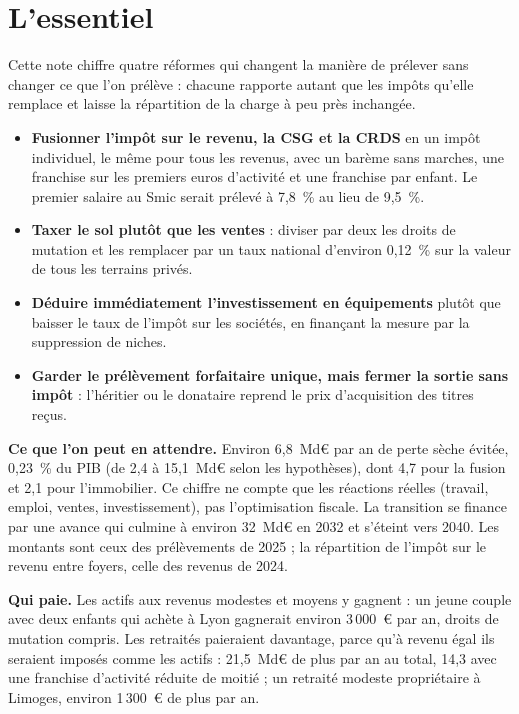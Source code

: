 \section*{L'essentiel}

Cette note chiffre quatre réformes qui changent la manière de prélever sans changer ce que l'on prélève : chacune
rapporte autant que les impôts qu'elle remplace et laisse la répartition de la charge à peu près inchangée.

\begin{itemize}\setlength{\itemsep}{1pt}
\item \textbf{Fusionner l'impôt sur le revenu, la CSG et la CRDS} en un impôt individuel, le même pour tous les revenus,
avec un barème sans marches, une franchise sur les premiers euros d'activité et une franchise par enfant. Le premier
salaire au Smic serait prélevé à 7,8~\% au lieu de 9,5~\%.
\item \textbf{Taxer le sol plutôt que les ventes} : diviser par deux les droits de mutation et les remplacer par un
taux national d'environ 0,12~\% sur la valeur de tous les terrains privés.
\item \textbf{Déduire immédiatement l'investissement en équipements} plutôt que baisser le taux de l'impôt sur les
sociétés, en finançant la mesure par la suppression de niches.
\item \textbf{Garder le prélèvement forfaitaire unique, mais fermer la sortie sans impôt} : l'héritier ou le
donataire reprend le prix d'acquisition des titres reçus.
\end{itemize}

\textbf{Ce que l'on peut en attendre.} Environ 6,8~Md€ par an de perte sèche évitée, 0,23~\% du PIB (de 2,4 à
15,1~Md€ selon les hypothèses), dont 4,7 pour la fusion et 2,1 pour l'immobilier. Ce chiffre ne compte que les
réactions réelles (travail, emploi, ventes, investissement), pas l'optimisation fiscale. La transition se finance par
une avance qui culmine à environ 32~Md€ en 2032 et s'éteint vers 2040. Les montants sont ceux des prélèvements de
2025 ; la répartition de l'impôt sur le revenu entre foyers, celle des revenus de 2024.

\textbf{Qui paie.} Les actifs aux revenus modestes et moyens y gagnent : un jeune couple avec deux enfants qui achète
à Lyon gagnerait environ 3\,000~€ par an, droits de mutation compris. Les retraités paieraient davantage, parce qu'à
revenu égal ils seraient imposés comme les actifs : 21,5~Md€ de plus par an au total, 14,3 avec une franchise
d'activité réduite de moitié ; un retraité modeste propriétaire à Limoges, environ 1\,300~€ de plus par an.

